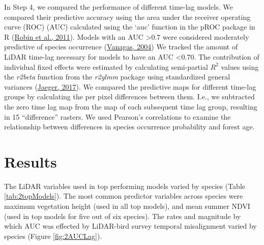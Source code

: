\documentclass[
  12pt,
]{article}
\begin{document}
In Step 4, we compared the performance of different time-lag models. We compared their predictive accuracy using the area under the receiver operating curve (ROC) (AUC) calculated using the `auc' function in the pROC package in R (\protect\hyperlink{ref-robinPROCOpensourcePackage2011}{Robin et al., 2011}). Models with an AUC \textgreater0.7 were considered moderately predictive of species occurrence (\protect\hyperlink{ref-vanagasReceiverOperatingCharacteristic2004}{Vanagas, 2004}) We tracked the amount of LiDAR time-lag necessary for models to have an AUC \textless0.70. The contribution of individual fixed effects were estimated by calculating semi-partial \(R^2\) values using the \emph{r2beta} function from the \emph{r2glmm} package using standardized general variances (\protect\hyperlink{ref-jaegerR2glmmComputesSquared2017}{Jaeger, 2017}). We compared the predictive maps for different time-lag groups by calculating the per pixel differences between them. I.e., we subtracted the zero time lag map from the map of each subsequent time lag group, resulting in 15 ``difference'' rasters. We used Pearson's correlations to examine the relationship between differences in species occurrence probability and forest age.

\hypertarget{results}{%
\section{Results}\label{results}}

The LiDAR variables used in top performing models varied by species (Table \ref{tab:2topModels}). The most common predictor variables across species were maximum vegetation height (used in all top models), and mean summer NDVI (used in top models for five out of six species). The rates and magnitude by which AUC was effected by LiDAR-bird survey temporal misalignment varied by species (Figure \ref{fig:2AUCLag}).
\end{document}
